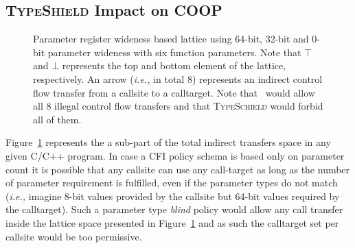 \subsection{\textsc{TypeShield} Impact on COOP}
\label{TypeShild Impact on COOP}
\begin{figure}[h!]
\centering
{}
\caption{Parameter register wideness based lattice using 64-bit, 32-bit and 0-bit parameter wideness with six 
function parameters. Note that $\top$ and $\bot$ represents the top and bottom element of the lattice, respectively.
An arrow (\textit{i.e.,} in total 8) represents an indirect control flow transfer from a callsite to a calltarget. Note that~\cite{veen:typearmor}
would allow all 8 illegal control flow transfers and that \textsc{TypeSchield} would forbid all of them.}
\label{fig:lattice3264}
\end{figure}
Figure~\ref{fig:lattice3264} represents the a sub-part of the total indirect transfers space in any given C/C++ program. 
In case a CFI policy schema is based only on parameter count it is possible that any callsite can use any call-target as long as the number of 
parameter requirement is fulfilled, even if the parameter types do not match (\textit{i.e.,} imagine 8-bit values provided by the callsite
but 64-bit values required by the calltarget). Such a parameter type \textit{blind} policy would allow any call transfer inside the lattice
space presented in Figure~\ref{fig:lattice3264} and as such the calltarget set per callsite would be too permissive.

